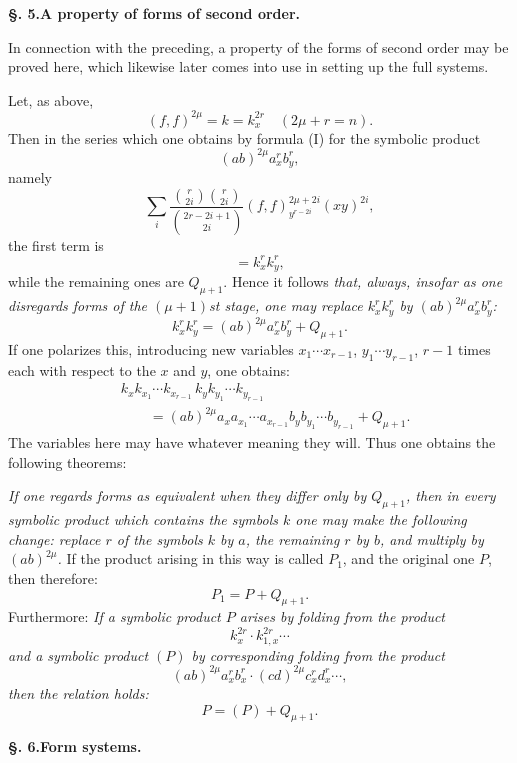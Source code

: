 \documentclass[10pt]{article}
\begin{document}
\begin{center}
{\bfseries §. 5.\quad A property of forms of second order.}
\end{center}

In connection with the preceding, a property of the forms of second order may be proved here, which likewise later comes into use in setting up the full systems.

Let, as above,
\[
(f,f)^{2\mu}=k=k_x^{2r}\quad (2\mu+r=n).
\]
Then in the series which one obtains by formula (I) for the symbolic product
\[
(ab)^{2\mu}a_x^r b_y^r,
\]
namely
\[
\sum_i\frac{\binom{r}{2i}\binom{r}{2i}}{\binom{2r-2i+1}{2i}}(f,f)^{2\mu+2i}_{y^{r-2i}}(xy)^{2i},
\]
the first term is
\[
=k_x^r k_y^r,
\]
while the remaining ones are $Q_{\mu+1}$. Hence it follows \emph{that, always, insofar as one disregards forms of the $(\mu+1)$st stage, one may replace $k_x^r k_y^r$ by $(ab)^{2\mu}a_x^r b_y^r$:}
\[
k_x^r k_y^r=(ab)^{2\mu}a_x^r b_y^r+Q_{\mu+1}.
\]
If one polarizes this, introducing new variables $x_1\cdots x_{r-1}$, $y_1\cdots y_{r-1}$, $r-1$ times each with respect to the $x$ and $y$, one obtains:
\[
\begin{aligned}
&k_xk_{x_1}\cdots k_{x_{r-1}}\,k_yk_{y_1}\cdots k_{y_{r-1}}\\
&\qquad =(ab)^{2\mu}a_xa_{x_1}\cdots a_{x_{r-1}}b_yb_{y_1}\cdots b_{y_{r-1}}+Q_{\mu+1}.
\end{aligned}
\]
The variables here may have whatever meaning they will. Thus one obtains the following theorems:

\emph{If one regards forms as equivalent when they differ only by $Q_{\mu+1}$, then in every symbolic product which contains the symbols $k$ one may make the following change: replace $r$ of the symbols $k$ by $a$, the remaining $r$ by $b$, and multiply by $(ab)^{2\mu}$.} If the product arising in this way is called $P_1$, and the original one $P$, then therefore:
\[
P_1=P+Q_{\mu+1}.
\]
Furthermore: \emph{If a symbolic product $P$ arises by folding from the product}
\[
k_x^{2r}\cdot k_{1,x}^{2r}\cdots
\]
\emph{and a symbolic product $(P)$ by corresponding folding from the product}
\[
(ab)^{2\mu}a_x^r b_x^r\cdot(cd)^{2\mu}c_x^r d_x^r\cdots,
\]
\emph{then the relation holds:}
\[
P=(P)+Q_{\mu+1}.
\]

\begin{center}
{\bfseries §. 6.\quad Form systems.}
\end{center}
\end{document}
